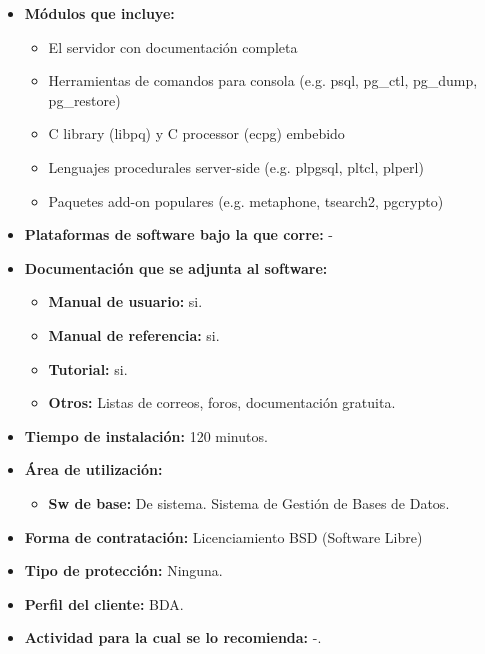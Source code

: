 \begin{itemize}
  \item \textbf{Módulos que incluye:} 
      \begin{itemize}
          \item El servidor con documentación completa
	  \item Herramientas de comandos para consola (e.g. psql, pg\_ctl, pg\_dump, pg\_restore)
          \item C library (libpq)  y C processor (ecpg) embebido
          \item Lenguajes procedurales server-side (e.g. plpgsql, pltcl, plperl)
          \item Paquetes add-on populares (e.g. metaphone, tsearch2, pgcrypto)
       \end{itemize}
  \item \textbf{Plataformas de software bajo la que corre:} -

  \item \textbf{Documentación que se adjunta al software:}
    \begin{itemize}
      \item \textbf{Manual de usuario:} si.
      \item \textbf{Manual de referencia:} si.
      \item \textbf{Tutorial:} si.
      \item \textbf{Otros:} Listas de correos, foros, documentación gratuita.
    \end{itemize}

  \item \textbf{Tiempo de instalación:} 120 minutos.

  \item \textbf{Área de utilización:}
    \begin{itemize}
      \item \textbf{Sw de base:} De sistema. Sistema de Gestión de Bases de Datos.
    \end{itemize}

  \item \textbf{Forma de contratación:} Licenciamiento BSD (Software Libre)
  \item \textbf{Tipo de protección:} Ninguna.
  \item \textbf{Perfil del cliente:} BDA.
  \item \textbf{Actividad para la cual se lo recomienda:} -.
\end{itemize}

